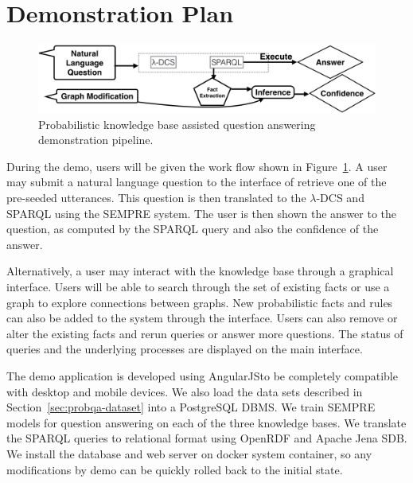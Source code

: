 
\section{Demonstration Plan}

\begin{figure}
\centering
 \includegraphics[width=0.9\linewidth]{images/probqa-pipeline.png}
 \caption{Probabilistic knowledge base assisted question answering demonstration pipeline.}
\label{fig:probqa-pipeline}
\end{figure}


During the demo, users will be given the work flow shown in Figure~\ref{fig:probqa-pipeline}.
A user may submit a natural language question to the interface of retrieve one of the pre-seeded utterances.
This question is then translated to the \(\lambda\)-DCS and SPARQL using the SEMPRE system.
The user is then shown the answer to the question, as computed by the SPARQL
query and also the confidence of the answer.

Alternatively, a user may interact with the knowledge base through a graphical interface.
Users will be able to search through the set of existing facts or use a graph to explore connections between graphs.
New probabilistic facts and rules can also be added to the system through the interface.
Users can also remove or alter the existing facts and rerun queries or answer more questions.
The status of queries and the underlying processes are displayed on the main interface.









The demo application is developed using AngularJS\@ to be completely compatible with desktop and mobile devices.
We also load the data sets described in Section~\ref{sec:probqa-dataset} into a PostgreSQL DBMS\@.
We train SEMPRE models for question answering on each of the three knowledge bases.
We translate the SPARQL queries to relational format using OpenRDF and Apache Jena SDB\@.
We install the database and web server on docker system container, so any modifications by demo can be quickly rolled back to the initial state.





